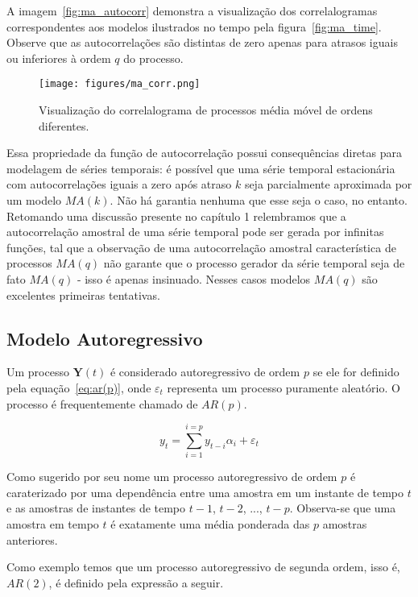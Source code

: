 A imagem~\ref{fig:ma_autocorr} demonstra a visualização dos correlalogramas
correspondentes aos modelos ilustrados no tempo pela figura~\ref{fig:ma_time}.
Observe que as autocorrelações são distintas de zero apenas para atrasos
iguais ou inferiores à ordem $q$ do processo.

\begin{figure}[H]
    \centering
    \texttt{[image: figures/ma\_corr.png]}
    \caption{Visualização do correlalograma de processos média móvel de ordens
    diferentes.}
    \label{fig:ma_corr}
\end{figure}

Essa propriedade da função de autocorrelação possui consequências diretas
para modelagem de séries temporais: é possível que uma série temporal
estacionária com autocorrelações iguais a zero após atraso $k$ seja
parcialmente aproximada por um modelo $MA(k)$. Não há garantia nenhuma que
esse seja o caso, no entanto. Retomando uma discussão presente no capítulo 1
relembramos que a autocorrelação amostral de uma série temporal pode ser
gerada por infinitas funções, tal que a observação de uma autocorrelação
amostral característica de processos $MA(q)$ não garante que o processo
gerador da série temporal seja de fato $MA(q)$ - isso é apenas insinuado.
Nesses casos modelos $MA(q)$ são excelentes primeiras tentativas.


\subsection{Modelo Autoregressivo}
\label{ssec:AR(p)}

Um processo $\mathbf{Y}(t)$ é considerado autoregressivo de ordem $p$ se ele
for definido pela equação~\ref{eq:ar(p)}, onde $\varepsilon_t$ representa um
processo puramente aleatório. O processo é frequentemente chamado de $AR(p)$.

\begin{equation}\label{eq:ar(p)}
   y_t = \sum_{i=1}^{i=p} y_{t-i}\alpha_i + \varepsilon_t
\end{equation}

Como sugerido por seu nome um processo autoregressivo de ordem $p$ é
caraterizado por uma dependência entre uma amostra em um instante de tempo $t$
e as amostras de instantes de tempo $t-1$, $t-2$, ..., $t-p$. Observa-se que
uma amostra em tempo $t$ é exatamente uma média ponderada das $p$ amostras
anteriores.

Como exemplo temos que um processo autoregressivo de segunda ordem, isso é,
$AR(2)$, é definido pela expressão a seguir.

